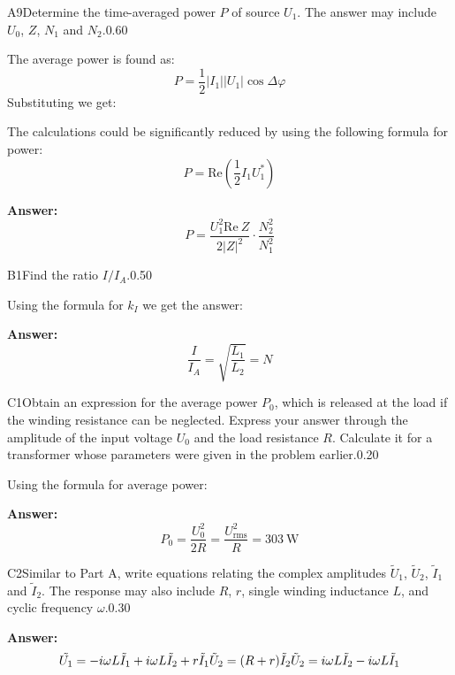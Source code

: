 \documentclass[11pt,a4paper]{article}
\begin{document}
\begin{solcard}{A9}{Determine the time-averaged power $P$ of source $U_1$. The answer may include $U_0$, $Z$, $N_1$ and $N_2$.}{0.60}

The average power is found as: $$P=\frac{1}{2} |I_1| |U_1|\cos{\Delta \varphi}$$Substituting we get:


The calculations could be significantly reduced by using the following formula for power: $$P=\text{Re}\left(\frac{1}{2} I_1 U_1^*\right)$$

\par\smallskip\noindent\textbf{Answer:} $$P = \frac{U_1^2 \text{Re}~Z}{2 |Z|^2}\cdot \frac{N_2^2}{N_1^2}$$
\end{solcard}

\begin{solcard}{B1}{Find the ratio $I / I_{A}$.}{0.50}

Using the formula for $k_I$ we get the answer:

\par\smallskip\noindent\textbf{Answer:} $$\frac{I}{I_A}=\sqrt{\frac{L_1}{L_2}} = N$$
\end{solcard}

\begin{solcard}{C1}{Obtain an expression for the average power $P_0$, which is released at the load if the winding resistance can be neglected. Express your answer through the amplitude of the input voltage $U_0$ and the load resistance $R$. Calculate it for a transformer whose parameters were given in the problem earlier.}{0.20}

Using the formula for average power:

\par\smallskip\noindent\textbf{Answer:} $$P_0=\frac{U_0^2}{2R} = \frac{U_\mathrm{rms}^2}{R} = 303 ~\text{W}$$
\end{solcard}

\begin{solcard}{C2}{Similar to Part A, write equations relating the complex amplitudes $\tilde U_1$, $\tilde U_2$, $\tilde I_1$ and $\tilde I_2$. The response may also include $R$, $r$, single winding inductance $L$, and cyclic frequency $\omega$.}{0.30}
\par\smallskip\noindent\textbf{Answer:} $$\tilde{U_1}=-i \omega L \tilde{I}_1+i \omega L \tilde{I}_2+r \tilde{I}_1 \\ \tilde{U}_2=(R+r) \tilde{I}_2 \\ \tilde{U}_2=i \omega L \tilde{I}_2-i \omega L \tilde{I}_1 \\$$
\end{solcard}
\end{document}
